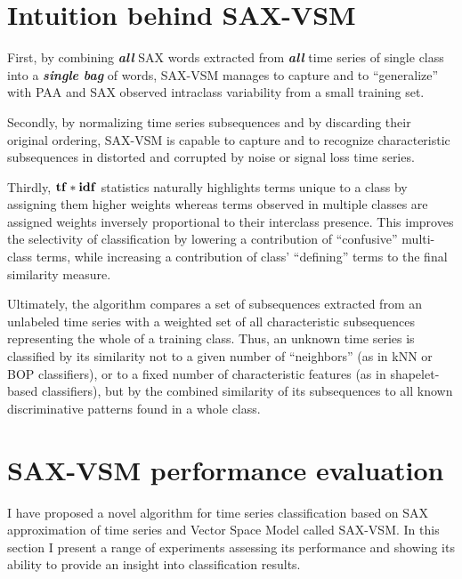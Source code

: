 \section{Intuition behind SAX-VSM}
First, by combining \textit{\textbf{all}} SAX words extracted from 
\textit{\textbf{all}} time series of single class into a \textit{\textbf{single bag}} of 
words, SAX-VSM manages to capture and to ``generalize'' with PAA and SAX 
observed intraclass variability from a small training set.  

Secondly, by normalizing time series subsequences and by discarding their original 
ordering, SAX-VSM is capable to capture and to recognize characteristic 
subsequences in distorted and corrupted by noise or signal loss time series. 

Thirdly,  $\text{\textbf{tf}}\ast\text{\textbf{idf}}$ statistics naturally highlights terms unique to a
class by assigning them higher weights whereas terms observed in multiple classes are 
assigned weights inversely proportional to their interclass presence. This
improves the selectivity of classification by lowering a contribution of ``confusive'' 
multi-class terms, while increasing a contribution of class' ``defining'' terms to the
final similarity measure.

Ultimately, the algorithm compares a set of subsequences extracted from an unlabeled 
time series with a weighted set of all characteristic subsequences representing the whole 
of a training class. 
Thus, an unknown time series is classified by its similarity not to a given number of 
``neighbors'' (as in kNN or BOP classifiers), or to a fixed number of characteristic features 
(as in shapelet-based classifiers), but by the combined similarity of its subsequences to 
all known discriminative patterns found in a whole class.

\section{SAX-VSM performance evaluation} \label{results}
I have proposed a novel algorithm for time series classification based on SAX
approximation of time series and Vector Space Model called SAX-VSM. 
In this section I present a range of experiments assessing its performance and showing
its ability to provide an insight into classification results.



